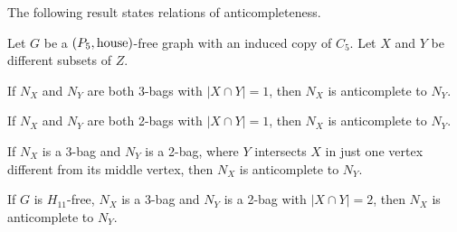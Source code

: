 The following result states relations of anticompleteness.

\begin{lemma}
    \label{lem:neighborhoods_c5_anti}
    Let $G$ be a $\left(P_5,\text{house}\right)$-free graph with an induced copy of
    $C_5$. Let $X$ and $Y$ be different subsets of $Z$.
    \begin{lemenum}
        \item If $N_X$ and $N_Y$ are both 3-bags with $|X\cap Y|=1$, then $N_X$
            is anticomplete to $N_Y$. \label{lem:c5_anticomp_1}
        \item If $N_X$ and $N_Y$ are both 2-bags with $|X\cap Y|=1$, then $N_X$
            is anticomplete to $N_Y$. \label{lem:c5_anticomp_2}
        \item If $N_X$ is a 3-bag and $N_Y$ is a 2-bag, where $Y$ intersects $X$
            in just one vertex different from its middle vertex, then $N_X$ is
            anticomplete to $N_Y$. \label{lem:c5_anticomp_3}
        \item If $G$ is $H_{11}$-free, $N_X$ is a 3-bag and $N_Y$ is a 2-bag
            with $|X\cap Y|=2$, then $N_X$ is anticomplete to $N_Y$.
            \label{lem:c5_anticomp_4}
    \end{lemenum}
\end{lemma}
    
